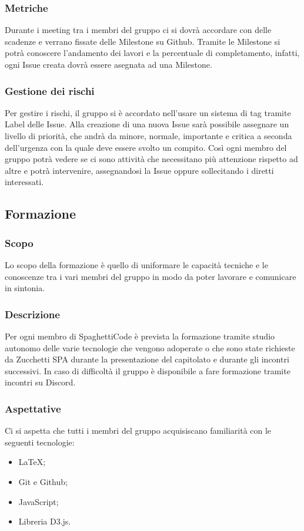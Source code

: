 \documentclass[../norme-di-progetto.tex]{subfiles}
\begin{document}
    \subsubsection{Metriche}
    Durante i meeting tra i membri del gruppo ci si dovrà accordare con delle scadenze e verrano fissate delle Milestone su Github. Tramite le Milestone si potrà conoscere l'andamento dei lavori e la percentuale di completamento, infatti, ogni Issue creata dovrà essere asegnata ad una Milestone. 
    \subsubsection{Gestione dei rischi}
    Per gestire i rischi, il gruppo si è accordato nell'usare un sistema di tag tramite Label delle Issue. Alla creazione di una nuova Issue sarà possibile assegnare un livello di priorità, che andrà da minore, normale, importante e critica a seconda dell'urgenza con la quale deve essere svolto un compito. Così ogni membro del gruppo potrà vedere se ci sono attività che necessitano più attenzione rispetto ad altre e potrà intervenire, assegnandosi la Issue oppure sollecitando i diretti interessati.

\subsection{Formazione}
    \subsubsection{Scopo}
    Lo scopo della formazione è quello di uniformare le capacità tecniche e le conoscenze tra i vari membri del gruppo in modo da poter lavorare e comunicare in sintonia.
    \subsubsection{Descrizione}
    Per ogni membro di SpaghettiCode è prevista la formazione tramite studio autonomo delle varie tecnologie che vengono adoperate o che sono state richieste da Zucchetti SPA durante la presentazione del capitolato e durante gli incontri successivi. In caso di difficoltà il gruppo è disponibile a fare formazione tramite incontri su Discord.
    \subsubsection{Aspettative}
    Ci si aspetta che tutti i membri del gruppo acquisiscano familiarità con le seguenti tecnologie:
    \begin{itemize}
        \item \LaTeX;
        \item Git e Github;
        \item JavaScript;
        \item Libreria D3.js.
    \end{itemize}
\end{document}
